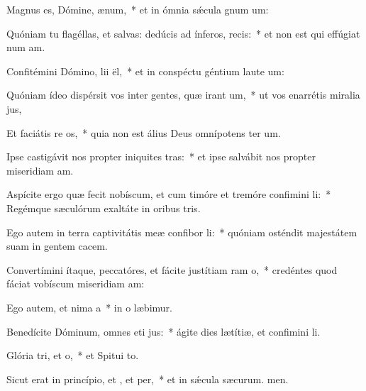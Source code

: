\item Magnus es, Dómine,  ænum,~* et in ómnia sǽcula gnum um:
\item Quóniam tu flagéllas, et salvas: dedúcis ad ínferos,  recis:~* et non est qui effúgiat num am.
\item Confitémini Dómino, lii ël,~* et in conspéctu géntium laute um:
\item Quóniam ídeo dispérsit vos inter gentes, quæ irant um,~* ut vos enarrétis miralia jus,
\item Et faciátis re os,~* quia non est álius Deus omnípotens ter um.
\item Ipse castigávit nos propter iniquites tras:~* et ipse salvábit nos propter miseridiam am.
\item Aspícite ergo quæ fecit nobíscum, et cum timóre et tremóre confimini li:~* Regémque sæculórum exaltáte in oribus tris.
\item Ego autem in terra captivitátis meæ confibor li:~* quóniam osténdit majestátem suam in gentem cacem.
\item Convertímini ítaque, peccatóres, et fácite justítiam ram o,~* credéntes quod fáciat vobíscum miseridiam am:
\item Ego autem, et nima a~* in o læbimur.
\item Benedícite Dóminum, omnes eti jus:~* ágite dies lætítiæ, et confimini li.
\item Glória tri, et o,~* et Spitui to.
\item Sicut erat in princípio, et , et per,~* et in sǽcula sæcurum. men.
